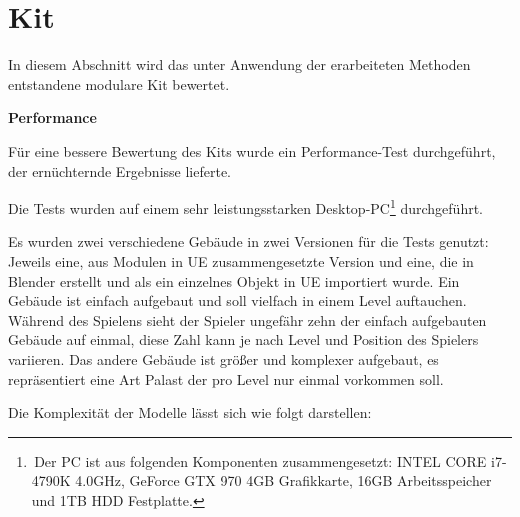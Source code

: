 \section{Kit}
In diesem Abschnitt wird das unter Anwendung der erarbeiteten Methoden entstandene modulare Kit bewertet.
\par\textbf{Performance}\par
Für eine bessere Bewertung des Kits wurde ein Performance-Test durchgeführt, der ernüchternde Ergebnisse lieferte.
\par
Die Tests wurden auf einem sehr leistungsstarken Desktop-PC\footnote{\,Der PC ist aus folgenden Komponenten zusammengesetzt: INTEL CORE i7-4790K 4.0GHz, GeForce GTX 970 4GB Grafikkarte, 16GB Arbeitsspeicher und 1TB HDD Festplatte.} durchgeführt. 
\par
Es wurden zwei verschiedene Gebäude in zwei Versionen für die Tests genutzt: Jeweils eine, aus Modulen in UE zusammengesetzte Version und eine, die in Blender erstellt und als ein einzelnes Objekt in UE importiert wurde. Ein Gebäude ist einfach aufgebaut und soll vielfach in einem Level auftauchen. Während des Spielens sieht der Spieler ungefähr zehn der einfach aufgebauten Gebäude auf einmal, diese Zahl kann je nach Level und Position des Spielers variieren. Das andere Gebäude ist größer und komplexer aufgebaut, es repräsentiert eine Art Palast der pro Level nur einmal vorkommen soll.
\par
Die Komplexität der Modelle lässt sich wie folgt darstellen:
